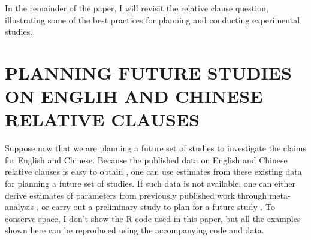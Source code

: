 \documentclass{ar-1col}\usepackage[]{graphicx}\usepackage[]{color}
\begin{document}





In the remainder of the paper, I will revisit the relative clause question, illustrating some of the best practices for planning and conducting experimental studies.

\section{PLANNING FUTURE STUDIES ON ENGLIH AND CHINESE RELATIVE CLAUSES} \label{before}

Suppose now that we are planning a future set of studies to investigate the claims for English and Chinese. Because the published data on English and Chinese relative clauses is easy to obtain \citep[][generously made their data publicly available]{grodner,gibsonwu}, one can use estimates from these existing data for planning a future set of studies. If such data is not available, one can either derive estimates of parameters from previously published work through meta-analysis \citep{VasishthetalPLoSOne2013,JaegerEngelmannVasishth2017,JaegerMertzenVanDykeVasishth2019,BuerkiEtAl2020,NicenboimRoettgeretal,NicenboimEtAlBayes2019}, or carry out a preliminary study to plan for a future study \citep{NicenboimEtAlCogSci2018}. To conserve space, I don't show the R code used in this paper, but all the examples shown here can be reproduced using the accompanying code and data.
\end{document}
